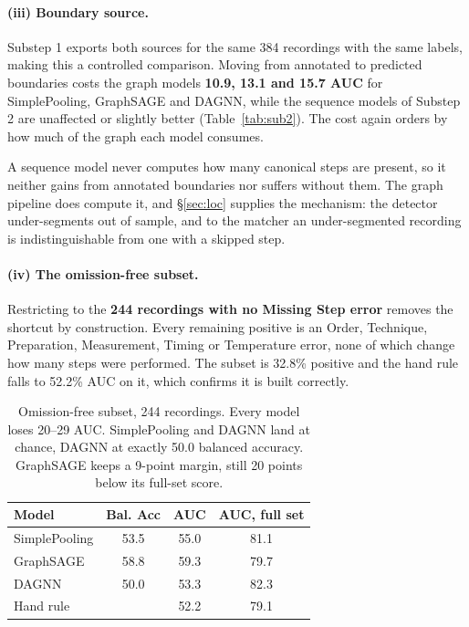 \documentclass[10pt,twocolumn,letterpaper]{article}
\begin{document}
\paragraph{(iii) Boundary source.} Substep 1 exports both sources for the same 384
recordings with the same labels, making this a controlled comparison. Moving from
annotated to predicted boundaries costs the graph models \textbf{10.9, 13.1 and
15.7 AUC} for SimplePooling, GraphSAGE and DAGNN, while the sequence models of
Substep 2 are unaffected or slightly better (Table~\ref{tab:sub2}). The cost again
orders by how much of the graph each model consumes.

A sequence model never computes how many canonical steps are present, so it neither
gains from annotated boundaries nor suffers without them. The graph pipeline does
compute it, and \S\ref{sec:loc} supplies the mechanism: the detector under-segments
out of sample, and to the matcher an under-segmented recording is indistinguishable
from one with a skipped step.

\paragraph{(iv) The omission-free subset.} Restricting to the \textbf{244
recordings with no Missing Step error} removes the shortcut by construction. Every
remaining positive is an Order, Technique, Preparation, Measurement, Timing or
Temperature error, none of which change how many steps were performed. The subset
is 32.8\% positive and the hand rule falls to 52.2\% AUC on it, which confirms it
is built correctly.

\begin{table}[t]
\centering\small
\setlength{\tabcolsep}{5pt}
\begin{tabular}{lccc}
\toprule
Model & Bal. Acc & AUC & AUC, full set \\
\midrule
SimplePooling & 53.5 & 55.0 & 81.1 \\
GraphSAGE     & 58.8 & 59.3 & 79.7 \\
DAGNN         & 50.0 & 53.3 & 82.3 \\
\midrule
\multicolumn{2}{l}{Hand rule} & 52.2 & 79.1 \\
\bottomrule
\end{tabular}
\caption{Omission-free subset, 244 recordings. Every model loses 20--29 AUC.
SimplePooling and DAGNN land at chance, DAGNN at exactly 50.0 balanced accuracy.
GraphSAGE keeps a 9-point margin, still 20 points below its full-set score.}
\label{tab:omission}
\end{table}
\end{document}
